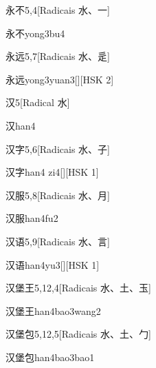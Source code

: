 \begin{entry}{永不}{5,4}[Radicais ⽔、⼀]
  \begin{phonetics}{永不}{yong3bu4}
  \end{phonetics}
\end{entry}

\begin{entry}{永远}{5,7}[Radicais ⽔、⾡]
  \begin{phonetics}{永远}{yong3yuan3}[][HSK 2]
  \end{phonetics}
\end{entry}

\begin{entry}{汉}{5}[Radical ⽔]
  \begin{phonetics}{汉}{han4}
  \end{phonetics}
\end{entry}

\begin{entry}{汉字}{5,6}[Radicais ⽔、⼦]
  \begin{phonetics}{汉字}{han4 zi4}[][HSK 1]
  \end{phonetics}
\end{entry}

\begin{entry}{汉服}{5,8}[Radicais ⽔、⽉]
  \begin{phonetics}{汉服}{han4fu2}
  \end{phonetics}
\end{entry}

\begin{entry}{汉语}{5,9}[Radicais ⽔、⾔]
  \begin{phonetics}{汉语}{han4yu3}[][HSK 1]
  \end{phonetics}
\end{entry}

\begin{entry}{汉堡王}{5,12,4}[Radicais ⽔、⼟、⽟]
  \begin{phonetics}{汉堡王}{han4bao3wang2}
  \end{phonetics}
\end{entry}

\begin{entry}{汉堡包}{5,12,5}[Radicais ⽔、⼟、⼓]
  \begin{phonetics}{汉堡包}{han4bao3bao1}
  \end{phonetics}
\end{entry}

